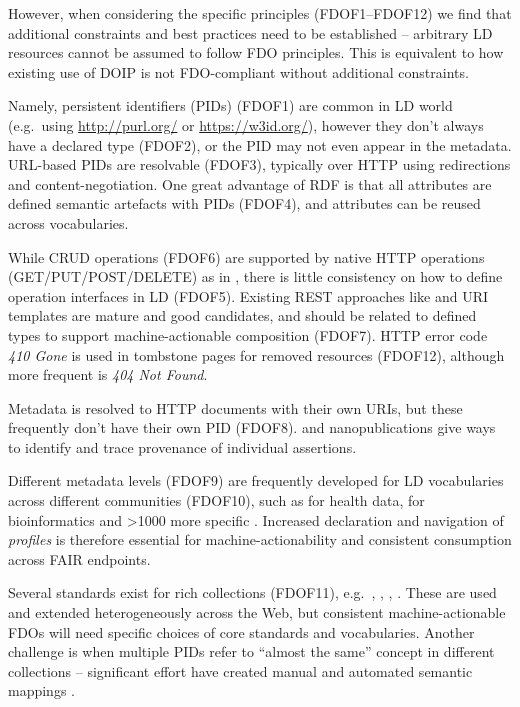 However, when considering the specific principles (FDOF1--FDOF12) we
find that additional constraints and best practices need to be
established -- arbitrary LD resources cannot be assumed to follow FDO
principles. This is equivalent to how existing use of DOIP is not
FDO-compliant without additional constraints.

Namely, persistent identifiers (PIDs) \cite{McMurry 2017}
(FDOF1) are common in LD world (e.g.~using \url{http://purl.org/} or
\url{https://w3id.org/}), however they don't always have a declared type
(FDOF2), or the PID may not even appear in the metadata. URL-based PIDs
are resolvable (FDOF3), typically over HTTP using redirections and
content-negotiation. One great advantage of RDF is that all attributes
are defined semantic artefacts with PIDs (FDOF4), and attributes can be
reused across vocabularies.

While CRUD operations (FDOF6) are supported by native HTTP operations
(GET/PUT/POST/DELETE) as in ,
there is little consistency on how to define operation interfaces in LD
(FDOF5). Existing REST approaches like
 \cite{OpenAPISpecificationV3} and
URI templates \cite{rfc6570} are mature and
good candidates, and should be related to defined types to support
machine-actionable composition (FDOF7). HTTP error code \emph{410 Gone}
is used in tombstone pages for removed resources (FDOF12), although more
frequent is \emph{404 Not Found}.

Metadata is resolved to HTTP documents with their own URIs, but these
frequently don't have their own PID (FDOF8).
 and nanopublications
\cite{Kuhn 2021} give ways
to identify and trace provenance of individual assertions.

Different metadata levels (FDOF9) are frequently developed for LD
vocabularies across different communities (FDOF10), such as
 for health data,
 for bioinformatics and
\textgreater1000 more specific
.
Increased declaration and navigation of \emph{profiles} is therefore
essential for machine-actionability and consistent consumption across
FAIR endpoints.

Several standards exist for rich collections (FDOF11),
e.g.~,
,
,
. These are used and extended
heterogeneously across the Web, but consistent machine-actionable FDOs
will need specific choices of core standards and vocabularies. Another
challenge is when multiple PIDs refer to ``almost the same'' concept in
different collections -- significant effort have created manual and
automated semantic mappings \cite{Baker 2013,de Mello 2022}.

